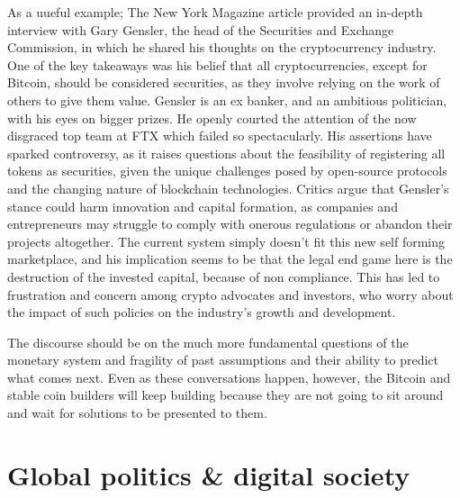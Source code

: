 As a uueful example; The New York Magazine article provided an in-depth interview with Gary Gensler, the head of the Securities and Exchange Commission, in which he shared his thoughts on the cryptocurrency industry. One of the key takeaways was his belief that all cryptocurrencies, except for Bitcoin, should be considered securities, as they involve relying on the work of others to give them value. Gensler is an ex banker, and an ambitious politician, with his eyes on bigger prizes. He openly courted the attention of the now disgraced top team at FTX which failed so spectacularly. His assertions have sparked controversy, as it raises questions about the feasibility of registering all tokens as securities, given the unique challenges posed by open-source protocols and the changing nature of blockchain technologies. Critics argue that Gensler's stance could harm innovation and capital formation, as companies and entrepreneurs may struggle to comply with onerous regulations or abandon their projects altogether. The current system simply doesn't fit this new self forming marketplace, and his implication seems to be that the legal end game here is the destruction of the invested capital, because of non compliance. This has led to frustration and concern among crypto advocates and investors, who worry about the impact of such policies on the industry's growth and development.\par
The discourse should be on the much more fundamental questions of the monetary system and fragility of past assumptions and their ability to predict what comes next. Even as these conversations happen, however, the Bitcoin and stable coin builders will keep building because they are not going to sit around and wait for solutions to be presented to them.
\section{Global politics \& digital society}
